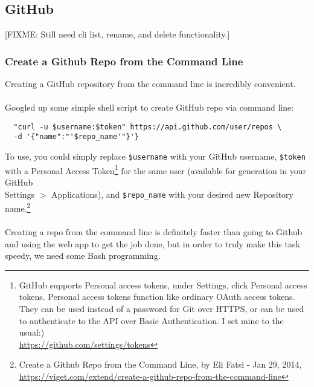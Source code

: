 \documentclass[12pt,letterpaper,dvips]{article}
\newcommand{\FIXME}[1]{\textsf{[FIXME: #1]}}
\newcommand{\cmd}[1]{\texttt{#1}}
\begin{document}
\subsection{GitHub}

\FIXME{Still need cli list, rename, and delete functionality.}

\subsubsection{Create a Github Repo from the Command Line}
Creating a GitHub repository from the command line is incredibly
convenient.
\\
\\
Googled up some simple shell script to create GitHub repo via
command line:

\begin{verbatim}
  "curl -u $username:$token" https://api.github.com/user/repos \
  -d '{"name":"'$repo_name'"}'}
\end{verbatim}

\noindent To use, you could simply replace \cmd{\$username} with your
GitHub username, \cmd{\$token} with a Personal Access Token\footnote{GitHub
supports Personal access tokens, under Settings, click Personal access
tokens. Personal access tokens function like ordinary OAuth access tokens.
They can be used instead of a password for Git over HTTPS, or can be used
to authenticate to the API over Basic Authentication.  I set mine to the usual:)\\
\href{https://github.com/settings/tokens}{https://github.com/settings/tokens}}
for the same user (available for generation in your GitHub\\
Settings $>$ Applications), and \cmd{\$repo\_name} with your
desired new Repository name.\footnote{Create a Github Repo
from the Command Line, by Eli Fatsi - Jan 29, 2014,\\
\href{https://viget.com/extend/create-a-github-repo-from-the-command-line}{https://viget.com/extend/create-a-github-repo-from-the-command-line}}
\\
\\
Creating a repo from the command line is definitely faster
than going to Github and using the web app to get the job
done, but in order to truly make this task speedy, we need
some Bash programming.
\end{document}
